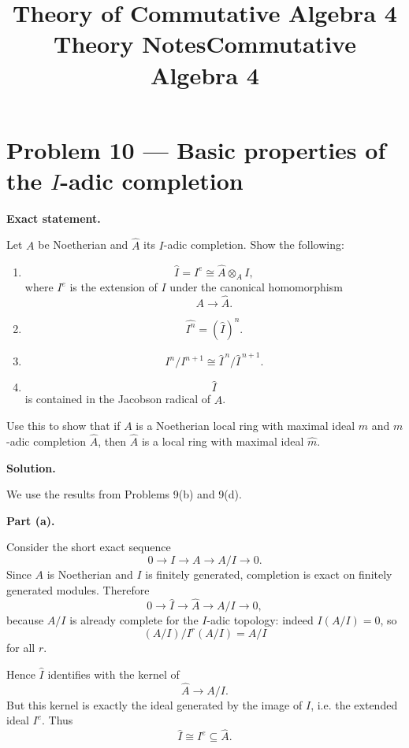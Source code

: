\documentclass[12pt,a4paper]{article}
\title{\bfseries Theory of Commutative Algebra 4 Theory Notes}
\title{Commutative Algebra 4}
\author{}
\date{}
\theoremstyle{plain}
\theoremstyle{definition}      %
\begin{document}
	\maketitle
	
		
	\tableofcontents
	\clearpage
	
	\section*{Problem 10 --- Basic properties of the \(I\)-adic completion}
	
	\textbf{Exact statement.}
	
	Let \(A\) be Noetherian and \(\widehat A\) its \(I\)-adic completion. Show the following:
	
	\begin{enumerate}
		\item[(a)]
		\[
		\widehat I = I^e \cong \widehat A \otimes_A I,
		\]
		where \(I^e\) is the extension of \(I\) under the canonical homomorphism
		\[
		A \to \widehat A.
		\]
		
		\item[(b)]
		\[
		\widehat{I^n} = (\widehat I)^n.
		\]
		
		\item[(c)]
		\[
		I^n/I^{n+1} \cong \widehat I^{\,n}/\widehat I^{\,n+1}.
		\]
		
		\item[(d)]
		\[
		\widehat I
		\]
		is contained in the Jacobson radical of \(\widehat A\).
	\end{enumerate}
	
	Use this to show that if \(A\) is a Noetherian local ring with maximal ideal \(m\) and \(m\)-adic completion \(\widehat A\), then \(\widehat A\) is a local ring with maximal ideal \(\widehat m\).
	
	\bigskip
	\textbf{Solution.}
	
	We use the results from Problems 9(b) and 9(d).
	
	\medskip
	\textbf{Part (a).}
	
	Consider the short exact sequence
	\[
	0 \to I \to A \to A/I \to 0.
	\]
	Since \(A\) is Noetherian and \(I\) is finitely generated, completion is exact on finitely generated modules. Therefore
	\[
	0 \to \widehat I \to \widehat A \to A/I \to 0,
	\]
	because \(A/I\) is already complete for the \(I\)-adic topology: indeed \(I(A/I)=0\), so
	\[
	(A/I)/I^r(A/I)=A/I
	\]
	for all \(r\).
	
	Hence \(\widehat I\) identifies with the kernel of
	\[
	\widehat A \to A/I.
	\]
	But this kernel is exactly the ideal generated by the image of \(I\), i.e. the extended ideal \(I^e\). Thus
	\[
	\widehat I \cong I^e \subseteq \widehat A.
	\]
	
\end{document}
